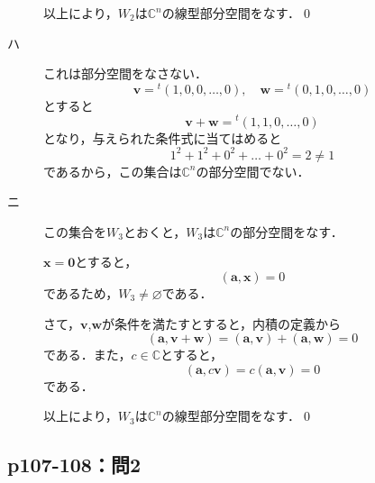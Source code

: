 \documentclass[uplatex,dvipdfmx,a4paper,10pt,fleqn]{jsarticle}
\begin{document}
\begin{leftbar}
\begin{description}
        以上により，$W_2$は$\mathbb{C}^n$の線型部分空間をなす．\qed
        \item [ハ] これは部分空間をなさない．
        \[
            \bm{v}= {}^t (1,0,0,\ldots , 0),\quad \bm{w}={}^t (0,1,0,\ldots ,0) 
        \]
            とすると
            \[
                \bm{v} + \bm{w}={}^t (1,1,0,\ldots,0)
            \]
        となり，与えられた条件式に当てはめると
        \[
            1^2+1^2+0^2 +\dots + 0^2 =2 \ne 1
        \]
        であるから，この集合は$\mathbb{C}^n$の部分空間でない．
        \item [ニ] この集合を$W_3$とおくと，$W_3$は$\mathbb{C}^n$の部分空間をなす．
        
        $\bm{x}=\bm{0}$とすると，
        \[
        (\bm{a},\bm{x}) =0
        \] 
        であるため，$W_3 \ne \varnothing$である．

        さて，$\bm{v}$,$\bm{w}$が条件を満たすとすると，内積の定義から
        \[
        (\bm{a},\bm{v}+\bm{w})=(\bm{a},\bm{v})+(\bm{a},\bm{w})=0
        \]
        である．また，$ c \in \mathbb{C}$とすると，
        \[
        (\bm{a},c\bm{v})=c(\bm{a},\bm{v})=0
        \]
        である．

        以上により，$W_3$は$\mathbb{C}^n$の線型部分空間をなす．\qed
    \end{description}
\end{leftbar}


\subsection*{p107-108：問2}
\end{document}

